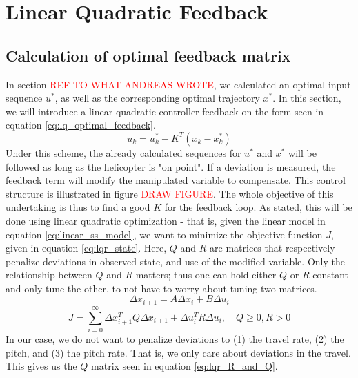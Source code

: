 \section{Linear Quadratic Feedback}\label{sec:linear_quadratic}
\subsection{Calculation of optimal feedback matrix}\label{sec:optimal_K_lqr}
In section \textcolor{red}{REF TO WHAT ANDREAS WROTE}, we calculated an optimal input sequence $u^*$, as well as the corresponding optimal trajectory $x^*$. In this section, we will introduce a linear quadratic controller feedback on the form seen in equation \ref{eq:lq_optimal_feedback}.
\begin{equation}\label{eq:lq_optimal_feedback}
    u_k = u_k^* - K^T(x_k - x_k^*)
\end{equation}
Under this scheme, the already calculated sequences for $u^*$ and $x^*$ will be followed as long as the helicopter is "on point". If a deviation is measured, the feedback term will modify the manipulated variable to compensate. This control structure is illustrated in figure \textcolor{red}{DRAW FIGURE}.
The whole objective of this undertaking is thus to find a good $K$ for the feedback loop. As stated, this will be done using linear quadratic optimization - that is, given the linear model in equation \ref{eq:linear_ss_model}, we want to minimize the objective function $J$, given in equation \ref{eq:lqr_state}. Here, $Q$ and $R$ are matrices that respectively penalize deviations in observed state, and use of the modified variable. Only the relationship between $Q$ and $R$ matters; thus one can hold either $Q$ or $R$ constant and only tune the other, to not have to worry about tuning two matrices.
\begin{equation}\label{eq:linear_ss_model}
    \Delta x_{i+1} = A\Delta x_i + B\Delta u_i
\end{equation}
\begin{equation}\label{eq:lqr_state}
    J = \sum_{i = 0}^\infty \Delta x_{i+1}^T Q \Delta x_{i+1} + \Delta u_i^T R \Delta u_i,\quad Q\geq0, R > 0
\end{equation}
In our case, we do not want to penalize deviations to (1) the travel rate, (2) the pitch, and (3) the pitch rate. That is, we only care about deviations in the travel. This gives us the $Q$ matrix seen in equation \ref{eq:lqr_R_and_Q}.
